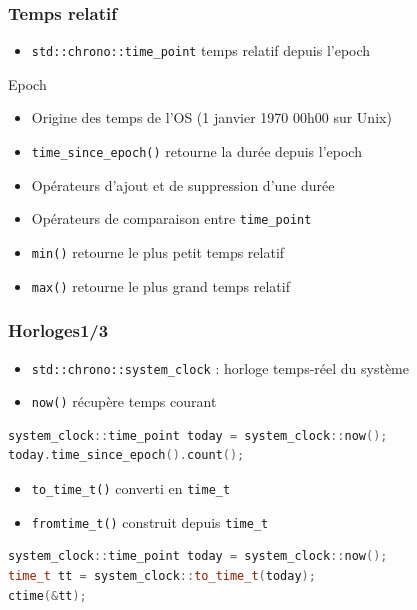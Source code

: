\documentclass[C++.tex]{subfiles}
\begin{document}
\begin{frame}[fragile]
	\frametitle{Temps relatif}
	\begin{itemize}
		\item \lstinline|std::chrono::time_point| temps relatif depuis l'epoch
	\end{itemize}

	\begin{block}{Epoch}
		\begin{itemize}
			\item Origine des temps de l'OS (1 janvier 1970 00h00 sur Unix)
		\end{itemize}
	\end{block}

	\begin{itemize}
		\item \lstinline|time_since_epoch()| retourne la durée depuis l'epoch
		\item Opérateurs d'ajout et de suppression d'une durée
		\item Opérateurs de comparaison entre \lstinline|time_point|
		\item \lstinline|min()| retourne le plus petit temps relatif
		\item \lstinline|max()| retourne le plus grand temps relatif
	\end{itemize}
\end{frame}

\begin{frame}[fragile]
	\frametitle{Horloges\titlehfill{}1/3}
	\begin{itemize}
		\item \lstinline|std::chrono::system_clock| : horloge temps-réel du système
		\item \lstinline|now()| récupère temps courant
	\end{itemize}

	\begin{lstlisting}[language=C++]
system_clock::time_point today = system_clock::now();
today.time_since_epoch().count();\end{lstlisting}

	\begin{itemize}
		\item \lstinline|to_time_t()| converti en \lstinline|time_t|
		\item \lstinline|fromtime_t()| construit depuis \lstinline|time_t|
	\end{itemize}

	\begin{lstlisting}[language=C++]
system_clock::time_point today = system_clock::now();
time_t tt = system_clock::to_time_t(today);
ctime(&tt);\end{lstlisting}
\end{frame}
\end{document}
